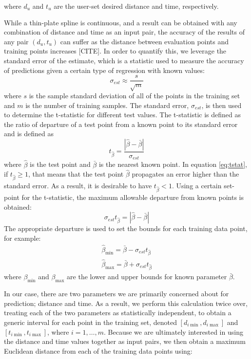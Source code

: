 \documentclass[letterpaper, 10 pt, conference]{ieeeconf}  %
\begin{document}
where $d_u$ and $t_u$ are the user-set desired distance and time, respectively.

While a thin-plate spline is continuous, and a result can be obtained with any combination of distance and time as an input pair, the accuracy of the results of any pair $(d_u,t_u)$ can suffer as the distance between evaluation points and training points increases [CITE]. In order to quantify this, we leverage the standard error of the estimate, which is a statistic used to measure the accuracy of predictions given a certain type of regression with known values:
\begin{equation} \label{eq:stderr}
    \sigma_{est} \approx \frac{s}{\sqrt{m}}
\end{equation}
where $s$ is the sample standard deviation of all of the points in the training set and $m$ is the number of training samples. The standard error, $\sigma_{est}$, is then used to determine the t-statistic for different test values. The t-statistic is defined as the ratio of departure of a test point from a known point to its standard error and is defined as
\begin{equation} \label{eq:tstat}
t_{\hat{\beta}} = \frac{|\hat{\beta}-\bar{\beta}|}{\sigma_{est}}    
\end{equation}
where $\hat{\beta}$ is the test point and $\bar{\beta}$ is the nearest known point. In equation \eqref{eq:tstat}, if $t_{\hat{\beta}} \geq 1$, that means that the test point $\hat{\beta}$ propagates an error higher than the standard error. As a result, it is desirable to have $t_{\hat{\beta}} < 1$. Using a certain set-point for the t-statistic, the maximum allowable departure from known points is obtained:
\begin{equation}
    \sigma_{est}t_{\hat{\beta}} = |\hat{\beta}-\bar{\beta}|
\end{equation}
The appropriate departure is used to set the bounds for each training data point, for example:
\begin{align}
    \hat{\beta}_{\min} = \bar{\beta} - \sigma_{est}t_{\hat{\beta}} \nonumber \\
    \hat{\beta}_{\max} = \bar{\beta} + \sigma_{est}t_{\hat{\beta}}
\end{align}
where $\beta_{\min}$ and $\beta_{\max}$ are the lower and upper bounds for known parameter $\bar{\beta}$.

In our case, there are two parameters we are primarily concerned about for prediction; distance and time. As a result, we perform this calculation twice over, treating each of the two parameters as statistically independent, to obtain a generic interval for each point in the training set, denoted $[d_{i\min},d_{i\max}]$ and $[t_{i\min},t_{i\max}]$, where $i=1,\ldots,m$. Because we are ultimately interested in using the distance and time values together as input pairs, we then obtain a maximum Euclidean distance from each of the training data points using:
\end{document}
